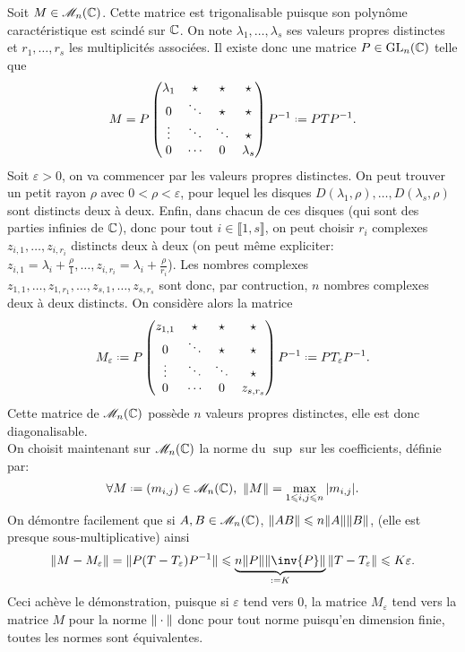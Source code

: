 \begin{preuve}
    Soit $M \in \mathscr{M}_n(\mathbb{C})$. Cette matrice est trigonalisable puisque son polynôme caractéristique est scindé sur $\mathbb{C}$. On note $\lambda_1, \dots, \lambda_s$ ses valeurs propres distinctes et $r_1, \dots, r_s$ les multiplicités associées. Il existe donc une matrice $P \in \mathrm{GL}_n(\mathbb{C})$ telle que
    $$
    M = P
    \begin{pmatrix}
        \lambda_1 & \star & \star & \star \\
        0 & \ddots & \star & \star \\
        \vdots & \ddots & \ddots & \star \\
        0 & \cdots & 0 & \lambda_s
    \end{pmatrix}
    \Inv{P} \defeq P T \Inv{P}.
    $$
    Soit $\varepsilon > 0$, on va commencer par  les valeurs propres distinctes. On peut trouver un petit rayon $\rho$ avec $0 < \rho < \varepsilon$, pour lequel les disques $D(\lambda_1, \rho), \dots, D(\lambda_s, \rho)$ sont distincts deux à deux. Enfin, dans chacun de ces disques (qui sont des parties infinies de $\mathbb{C}$), donc pour tout $i \in \llbracket 1, s \rrbracket$, on peut choisir $r_i$ complexes $z_{i,1}, \dots, z_{i,r_i}$ distincts deux à deux (on peut même expliciter: $z_{i,1} = \lambda_i + \frac{\rho}{1}, \dots, z_{i, r_i} = \lambda_i + \frac{\rho}{r_i}$). Les nombres complexes $z_{1, 1}, \dots, z_{1, r_1}, \dots, z_{s, 1}, \dots, z_{s, r_s}$ sont donc, par contruction, $n$ nombres complexes deux à deux distincts. On considère alors la matrice
    $$M_\varepsilon \defeq P 
    \begin{pmatrix}
        z_{1, 1} & \star & \star & \star \\
        0 & \ddots & \star & \star \\
        \vdots & \ddots & \ddots & \star \\
        0 & \cdots & 0 & z_{s, r_s}
    \end{pmatrix}
    \Inv{P} \defeq P T_\varepsilon \Inv{P}.
    $$
    Cette matrice de $\mathscr{M}_n(\mathbb{C})$ possède $n$ valeurs propres distinctes, elle est donc diagonalisable. \\
    On choisit maintenant sur $\mathscr{M}_n(\mathbb{C})$ la norme du $\sup$ sur les coefficients, définie par:
    $$\forall M \defeq (m_{i,j}) \in \M_n(\C),\ \norme{M} = \max_{1 \leqslant i, j \leqslant n} |m_{i,j}|.$$
    On démontre facilement que si $A, B \in \mathscr{M}_n(\mathbb{C})$, $\Vert AB \Vert \leqslant n \Vert A \Vert \Vert B \Vert$, (elle est presque sous-multiplicative) ainsi
    $$\norme{M - M_\varepsilon} = \norme{P (T - T_\varepsilon) \Inv{P}} \leqslant \underbrace{n \norme{P} \norme{\inv{P}}}_{\defeq K} \norme{T - T_\varepsilon} \leqslant K \varepsilon.$$
    Ceci achève le démonstration, puisque si $\varepsilon$ tend vers $0$, la matrice $M_\varepsilon$ tend vers la matrice $M$ pour la norme $\Vert \cdot \Vert$ donc pour tout norme puisqu'en dimension finie, toutes les normes sont équivalentes.
\end{preuve}
